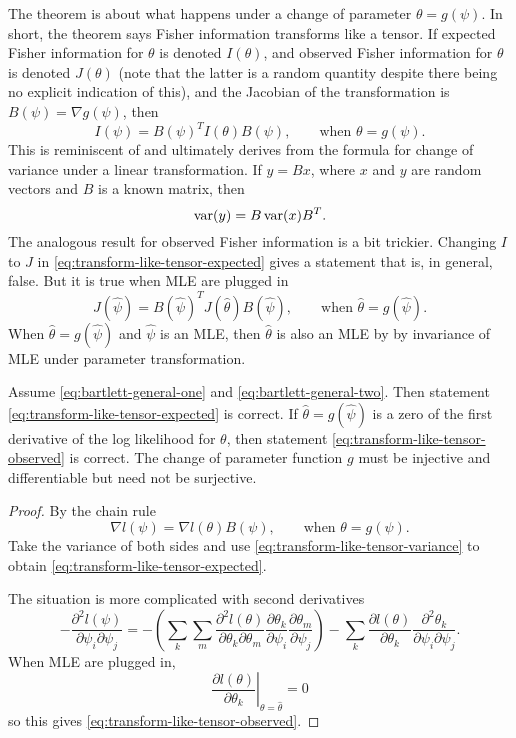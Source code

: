 The theorem is about what happens under a change of parameter
$\theta = g(\psi)$.  In short, the theorem says Fisher information
transforms like a tensor.
If expected Fisher information for $\theta$ is denoted $I(\theta)$,
and observed Fisher information for $\theta$ is denoted $J(\theta)$
(note that the latter is a random quantity despite there being no
explicit indication of this), and the Jacobian of the transformation
is $B(\psi) = \nabla g(\psi)$, then
\begin{equation} \label{eq:transform-like-tensor-expected}
   I(\psi) = B(\psi)^T I(\theta) B(\psi), \qquad \text{when $\theta = g(\psi)$}.
\end{equation}
This is reminiscent of and ultimately derives from the formula for change
of variance under a linear transformation.  If $y = B x$, where $x$ and $y$
are random vectors and $B$ is a known matrix, then
\begin{equation} \label{eq:transform-like-tensor-variance}
   \operatorname{var}(y) = B \operatorname{var}(x) B^T.
\end{equation}
The analogous result for observed Fisher information is a bit trickier.
Changing $I$ to $J$ in \eqref{eq:transform-like-tensor-expected} gives
a statement that is, in general, false.  But it is true when MLE are
plugged in
\begin{equation} \label{eq:transform-like-tensor-observed}
   J(\hat{\psi}) = B(\hat{\psi})^T J(\hat{\theta}) B(\hat{\psi}),
   \qquad \text{when $\hat{\theta} = g(\hat{\psi})$}.
\end{equation}
When $\hat{\theta} = g(\hat{\psi})$ and $\hat{\psi}$ is an MLE, then
$\hat{\theta}$ is also an MLE by by invariance of MLE under
parameter transformation.
\begin{theorem}
Assume \eqref{eq:bartlett-general-one} and \eqref{eq:bartlett-general-two}.
Then statement \eqref{eq:transform-like-tensor-expected} is correct.
If $\hat{\theta} = g(\hat{\psi})$ is a zero of the first derivative of
the log likelihood for $\theta$,
then statement \eqref{eq:transform-like-tensor-observed} is correct.
The change of parameter function $g$ must be injective and differentiable
but need not be surjective.
\end{theorem}
\begin{proof}
By the chain rule
$$
   \nabla l(\psi)
   = \nabla l(\theta) B(\psi), \qquad \text{when $\theta = g(\psi)$}.
$$
Take the variance of both sides and
use \eqref{eq:transform-like-tensor-variance}
to obtain \eqref{eq:transform-like-tensor-expected}.

The situation is more complicated with second derivatives
$$
   - \frac{\partial^2 l(\psi)}{\partial \psi_i \partial \psi_j}
   =
   -
   \left(
   \sum_k \sum_m
   \frac{\partial^2 l(\theta)}{\partial \theta_k \partial \theta_m}
   \frac{\partial \theta_k}{\partial \psi_i}
   \frac{\partial \theta_m}{\partial \psi_j}
   \right)
   -
   \sum_k
   \frac{\partial l(\theta)}{\partial \theta_k}
   \frac{\partial^2 \theta_k}{\partial \psi_i \partial \psi_j}.
$$
When MLE are plugged in,
$$
   \left. \frac{\partial l(\theta)}{\partial \theta_k}
   \right|_{\theta = \hat{\theta}} = 0
$$
so this gives \eqref{eq:transform-like-tensor-observed}.
\end{proof}

